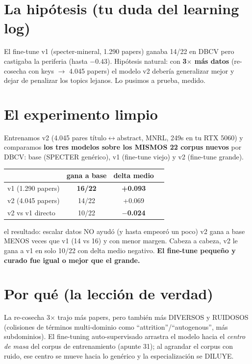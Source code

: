 \documentclass[11pt,a4paper]{article}
\begin{document}
\section{La hipótesis (tu duda del learning log)}

El fine-tune v1 (specter-mineral, 1.290 papers) ganaba 14/22 en DBCV pero castigaba la
periferia (hasta $-0.43$). Hipótesis natural: con \textbf{3$\times$ más datos}
(re-cosecha con keys $\to$ 4.045 papers) el modelo v2 debería generalizar mejor y dejar
de penalizar los topics lejanos. Lo pusimos a prueba, medido.

\section{El experimento limpio}

Entrenamos v2 (4.045 pares título$\leftrightarrow$abstract, MNRL, 249s en tu RTX 5060) y
comparamos \textbf{los tres modelos sobre los MISMOS 22 corpus nuevos} por DBCV: base
(SPECTER genérico), v1 (fine-tune viejo) y v2 (fine-tune grande).

\begin{center}
\begin{tabular}{lccc}
 & gana a base & delta medio \\
\hline
v1 (1.290 papers) & \textbf{16/22} & \textbf{+0.093} \\
v2 (4.045 papers) & 14/22 & +0.069 \\
v2 vs v1 directo & 10/22 & \textbf{$-$0.024} \\
\end{tabular}
\end{center}

\begin{concepto}{el resultado: escalar datos NO ayudó (y hasta empeoró un poco)}
v2 gana a base MENOS veces que v1 (14 vs 16) y con menor margen. Cabeza a cabeza,
v2 le gana a v1 en solo 10/22 con delta medio negativo. \textbf{El fine-tune pequeño y
curado fue igual o mejor que el grande.}
\end{concepto}

\section{Por qué (la lección de verdad)}

La re-cosecha 3$\times$ trajo más papers, pero también más DIVERSOS y RUIDOSOS
(colisiones de términos multi-dominio como ``attrition''/``autogenous'', más subdominios).
El fine-tuning auto-supervisado arrastra el modelo hacia el \emph{centro de masa} del
corpus de entrenamiento (apunte 31); al agrandar el corpus con ruido, ese centro se
mueve hacia lo genérico y la especialización se DILUYE.
\end{document}
